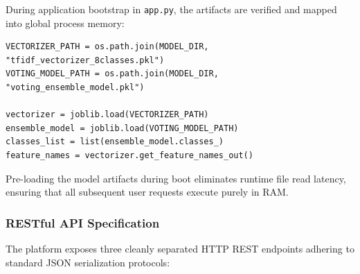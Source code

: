 During application bootstrap in \texttt{app.py}, the artifacts are verified and mapped into global process memory:
\begin{footnotesize}
\begin{verbatim}
VECTORIZER_PATH = os.path.join(MODEL_DIR, "tfidf_vectorizer_8classes.pkl")
VOTING_MODEL_PATH = os.path.join(MODEL_DIR, "voting_ensemble_model.pkl")

vectorizer = joblib.load(VECTORIZER_PATH)
ensemble_model = joblib.load(VOTING_MODEL_PATH)
classes_list = list(ensemble_model.classes_)
feature_names = vectorizer.get_feature_names_out()
\end{verbatim}
\end{footnotesize}

Pre-loading the model artifacts during boot eliminates runtime file read latency, ensuring that all subsequent user requests execute purely in RAM.

\subsubsection{RESTful API Specification}

The platform exposes three cleanly separated HTTP REST endpoints adhering to standard JSON serialization protocols:

